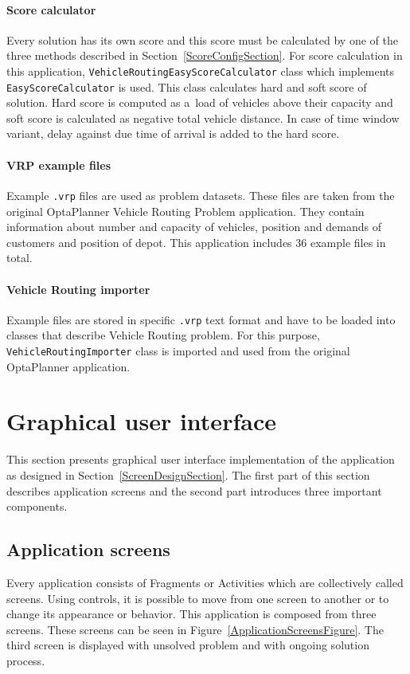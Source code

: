 \paragraph{Score calculator}
Every solution has its own score and this score must be calculated by one of the three methods described in
Section~\ref{ScoreConfigSection}. For score calculation in this application, \texttt{VehicleRoutingEasyScoreCalculator}
class which implements \texttt{EasyScoreCalculator} is used. This class calculates hard and soft score of solution. Hard
score is computed as a~load of vehicles above their capacity and soft score is calculated as negative total vehicle
distance. In case of time window variant, delay against due time of arrival is added to the hard score.

\paragraph{VRP example files}
Example \texttt{.vrp} files are used as problem datasets. These files are taken from the original OptaPlanner Vehicle
Routing Problem application. They contain information about number and capacity of vehicles, position and demands of
customers and position of depot. This application includes 36 example files in total.

\paragraph{Vehicle Routing importer}
Example files are stored in specific \texttt{.vrp} text format and have to be loaded into classes that describe Vehicle
Routing problem. For this purpose, \texttt{VehicleRoutingImporter} class is imported and used from the original
OptaPlanner application.

\section{Graphical user interface}\label{GuiSection}
This section presents graphical user interface implementation of the application as designed in
Section~\ref{ScreenDesignSection}. The first part of this section describes application screens and the second part
introduces three important components.

\subsection{Application screens}
Every application consists of Fragments or Activities which are collectively called screens. Using controls, it is
possible to move from one screen to another or to change its appearance or behavior. This application is composed from
three screens. These screens can be seen in Figure~\ref{ApplicationScreensFigure}. The third screen is displayed with
unsolved problem and with ongoing solution process.

